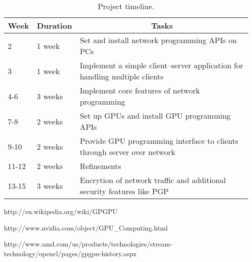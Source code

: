 \documentclass{article}
\begin{document}
\begin{table}[h]
\begin{center}
\vspace{0.3cm}
	\begin{tabular}{llp{10cm}}
	\hline \hline
		\textbf{Week} \rule{0pt}{2.6ex} & \textbf{Duration} & \multicolumn{1}{c}{\textbf{Tasks}}\\
		\hline
		2 \rule{0pt}{2.6ex} & 1 week & Set and install network programming APIs on PCs\\
		3 & 1 week & Implement a simple client--server application for handling multiple clients\\
		4-6 & 3 weeks & Implement core features of network programming\\
		7-8 & 2 weeks & Set up GPUs and install GPU programming APIs\\
		9-10 & 2 weeks & Provide GPU programming interface to clients through server over network\\
		11-12 & 2 weeks & Refinements\\
		13-15 & 3 weeks & Encrytion of network traffic and additional security features like PGP\\
	\hline \hline
	\end{tabular}
\end{center}
\label{TimelineTable}
\caption{Project timeline.}
\end{table}

\begin{thebibliography}{2}

http://en.wikipedia.org/wiki/GPGPU

http://www.nvidia.com/object/GPU\_Computing.html

http://www.amd.com/us/products/technologies/stream-technology/opencl/pages/gpgpu-history.aspx

\end{thebibliography}
\end{document}
